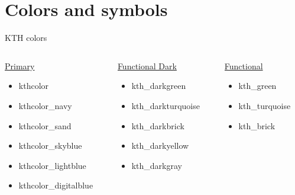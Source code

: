 \documentclass[aspectratio=169,11pt]{beamer}
\begin{document}
\section{Colors and symbols}
\transitionpage{\insertsection}
\normalpageline
\begin{frame}{\insertsection}{KTH colors}
    \begin{columns}[t]
        \begin{column}{0.3\textwidth}
            \underline{Primary}
            \begin{itemize}
                \item \textcolor{kthcolor}{kthcolor}
                \item \textcolor{kthcolor_navy}{kthcolor\_navy}
                \item \textcolor{kthcolor_sand}{kthcolor\_sand}
                \item \textcolor{kthcolor_skyblue}{kthcolor\_skyblue}
                \item \textcolor{kthcolor_lightblue}{kthcolor\_lightblue}
                \item \textcolor{kthcolor_digitalblue}{kthcolor\_digitalblue}
            \end{itemize}
        \end{column}
        \begin{column}{0.28\textwidth}
            \underline{Functional Dark}
            \begin{itemize}
                \item \textcolor{kth_darkgreen}{kth\_darkgreen}
                \item \textcolor{kth_darkturquoise}{kth\_darkturquoise}
                \item \textcolor{kth_darkbrick}{kth\_darkbrick}
                \item \textcolor{kth_darkyellow}{kth\_darkyellow}
                \item \textcolor{kth_darkgray}{kth\_darkgray}
            \end{itemize}
        \end{column}
        \begin{column}{0.24\textwidth}
            \underline{Functional}
            \begin{itemize}
                \item \textcolor{kth_green}{kth\_green}
                \item \textcolor{kth_turquoise}{kth\_turquoise}
                \item \textcolor{kth_brick}{kth\_brick}

\end{itemize}
\end{column}
\end{columns}
\end{frame}
\end{document}
